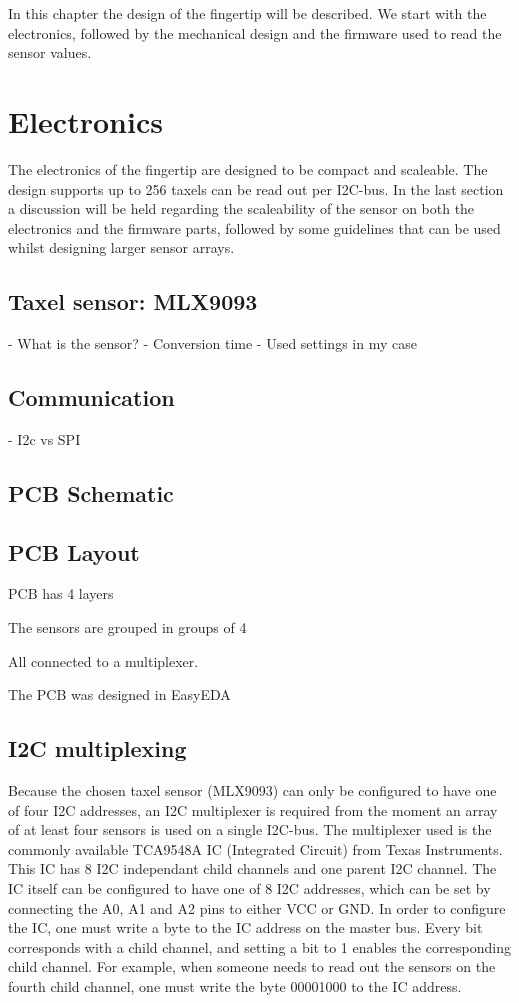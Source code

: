In this chapter the design of the fingertip will be described. We start with the electronics, followed by the mechanical design and the firmware used to read the sensor values.

\section{Electronics}

The electronics of the fingertip are designed to be compact and scaleable. The design supports up to 256 taxels can be read out per I2C-bus. In the last section a discussion will be held 
regarding the scaleability of the sensor on both the electronics and the firmware parts, followed by some guidelines that can be used whilst designing larger sensor arrays.

\subsection{Taxel sensor: MLX9093}

- What is the sensor?
- Conversion time
- Used settings in my case


\subsection{Communication}
- I2c vs SPI

\subsection{PCB Schematic}



\subsection{PCB Layout}

PCB has 4 layers

The sensors are grouped in groups of 4

All connected to a multiplexer.

The PCB was designed in EasyEDA


\subsection{I2C multiplexing}

Because the chosen taxel sensor (MLX9093) can only be configured to have one of four I2C addresses, an I2C multiplexer is required from the moment an array of at least four sensors 
is used on a single I2C-bus. The multiplexer used is the commonly available TCA9548A IC (Integrated Circuit) from Texas Instruments. 
This IC has 8 I2C independant child channels and one parent I2C channel.
The IC itself can be configured to have one of 8 I2C addresses, which can be set by connecting the A0, A1 and A2 pins to either VCC or GND.
In order to configure the IC, one must write a byte to the IC address on the master bus. Every bit corresponds with a child channel, and setting a bit to 1 enables the corresponding child channel.
For example, when someone needs to read out the sensors on the fourth child channel, one must write the byte 00001000 to the IC address.

